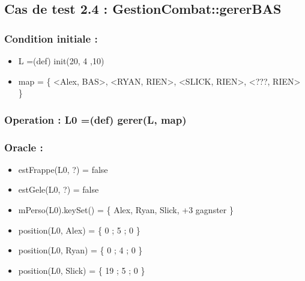 \documentclass[11pt]{article}
\begin{document}
\subsection{Cas de test 2.4 : GestionCombat::gererBAS}
\label{sec-1.5}

\subsubsection{Condition initiale :}
\label{sec-1.5.1}

\begin{itemize}

\item L =(def) init(20, 4 ,10)\\
\label{sec-1.5.1.1}


\item map = \{ <Alex, BAS>, <RYAN, RIEN>, <SLICK, RIEN>, <???, RIEN> \}\\
\label{sec-1.5.1.2}

\end{itemize} %
\subsubsection{Operation : L0 =(def) gerer(L, map)}
\label{sec-1.5.2}

\subsubsection{Oracle :}
\label{sec-1.5.3}

\begin{itemize}

\item estFrappe(L0, ?) = false\\
\label{sec-1.5.3.1}


\item estGele(L0, ?) = false\\
\label{sec-1.5.3.2}


\item mPerso(L0).keySet() = \{ Alex, Ryan, Slick, +3 gagnster \}\\
\label{sec-1.5.3.3}


\item position(L0, Alex) = \{ 0 ; 5 ; 0 \}\\
\label{sec-1.5.3.4}


\item position(L0, Ryan) = \{ 0 ; 4 ; 0 \}\\
\label{sec-1.5.3.5}


\item position(L0, Slick) = \{ 19 ; 5 ; 0 \}\\
\label{sec-1.5.3.6}


\end{itemize} %
\end{document}
